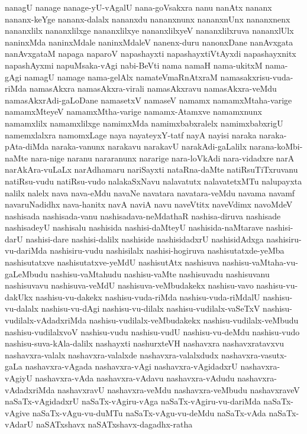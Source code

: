 {nanagU
nanage
nanage-yU-vAgalU
nana-goVsakxra
nanu
nanAtx
nananx
nananx-keYge
nananx-dalalx
nananxdu
nananxnunx
nananxnUnx
nananxnenx
nananxlilx
nananxlilxge
nananxlilxye
nananxlilxyeV
nananxlilxruva
nananxlUlx
naninxMda
naninxMdale
naninxMdaleV
nanenx-duru
nanonxDane
nanAvxgata
nanAvxgataM
napaga
naparoV
napashayxti
napashayxtiVtAyxdi
napashayxnitx
napashAyxmi
napuMsaka-vAgi
nabi-BeVti
nama
namaH
nama-ukitxM
nama-gAgi
namagU
namage
nama-gelAlx
namateVmaRnAtxraM
namasakxrisu-vuda-riMda
namasAkxra
namasAkxra-virali
namasAkxravu
namasAkxra-veMdu
namasAkxrAdi-gaLoDane
namasetxV
namaseV
namamx
namamxMtaha-varige
namamxMteyeV
namamxMtha-varige
namamx-Atamxve
namamxnunx
namamxlilx
namamxlilxge
namimxMda
namimxbabxralelx
namimxbabxrigU
namemxlalxra
namomxLage
naya
nayateyxY-tatf
nayA
nayisi
naraka
naraka-pAta-diMda
naraka-vanunx
narakavu
narakavU
narakAdi-gaLalilx
narana-koMbi-naMte
nara-nige
naranu
nararanunx
nararige
nara-loVkAdi
nara-vidadxre
narA
narAkAra-vuLaLx
narAdhamaru
nariSayxti
nataRna-daMte
natiRsuTiTxruvanu
natiRsu-vudu
natiRsu-vudo
nalakaSxNavu
nalavatutx
nalavatetxMTu
nalupayxta
nalilx
nalelx
nava
nava-eMdu
navaNe
navatara
navatara-veMdu
navama
navamf
navaruNadidhx
nava-hanitx
navA
naviA
navu
naveVtitx
naveVdimx
navoMdeV
nashisada
nashisada-vanu
nashisadava-neMdathaR
nashisa-diruva
nashisade
nashisadeyU
nashisalu
nashisida
nashisi-daMteyU
nashisida-naMtarave
nashisi-darU
nashisi-dare
nashisi-dalilx
nashiside
nashisidadxrU
nashisidAdxga
nashisiru-vu-dariMda
nashisiru-vudu
nashisilalx
nashisi-hogiruva
nashisutatxde-yeMba
nashisutatxve
nashisutatxve-yeMdU
nashisutAtx
nashisuva
nashisu-vaMtaha-vu-gaLeMbudu
nashisu-vaMtahudu
nashisu-vaMte
nashisuvadu
nashisuvanu
nashisuvavu
nashisuva-veMdU
nashisuva-veMbudakekx
nashisu-vavo
nashisu-vu-dakUkx
nashisu-vu-dakekx
nashisu-vuda-riMda
nashisu-vuda-riMdalU
nashisu-vu-dalalx
nashisu-vu-dAgi
nashisu-vu-dilalx
nashisu-vudilalx-vaSeTxV
nashisu-vudilalx-vAdadxriMda
nashisu-vudilalx-veMbudakekx
nashisu-vudilalx-veMbudu
nashisu-vudilalxvoV
nashisu-vudu
nashisu-vudU
nashisu-vu-deMdu
nashisu-vudo
nashisu-suva-kAla-dalilx
nashayxti
nashurxteVH
nashavxra
nashavxratavxvu
nashavxra-valalx
nashavxra-valalxde
nashavxra-valalxdudx
nashavxra-vasutx-gaLa
nashavxra-vAgada
nashavxra-vAgi
nashavxra-vAgidadxrU
nashavxra-vAgiyU
nashavxra-vAda
nashavxra-vAdavu
nashavxra-vAdudu
nashavxra-vAdadxriMda
nashavxravU
nashavxra-veMdu
nashavxra-veMbudu
nashavxraveV
naSaTx-vAgidadxrU
naSaTx-vAgiru-vAga
naSaTx-vAgiru-vu-dariMda
naSaTx-vAgive
naSaTx-vAgu-vu-duMTu
naSaTx-vAgu-vu-deMdu
naSaTx-vAda
naSaTx-vAdarU
naSATxshavx
naSATxshavx-dagadhx-ratha
}
